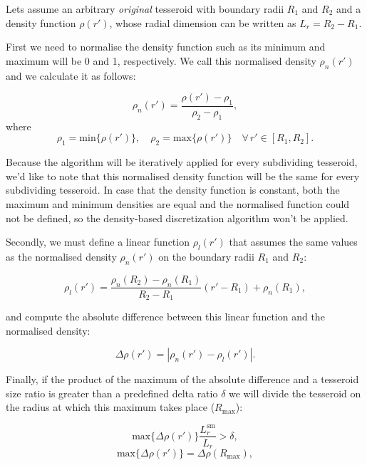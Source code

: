 \documentclass[extra]{gji}
\begin{document}
Lets assume an arbitrary \emph{original} tesseroid with boundary radii 
$R_1$ and $R_2$ and a density function $\rho(r')$, whose radial 
dimension can be written as $L_r = R_2 - R_1$.

First we need to normalise the density function such as its minimum and 
maximum will be 0 and 1, respectively.
We call this normalised density $\rho_n(r')$ and we calculate it as 
follows:

\begin{equation}
    \rho_n(r') = \frac{\rho(r') - \rho_1}{\rho_2 - \rho_1},
\end{equation}
\noindent where
\begin{equation}
    \rho_1 = \text{min}\{ \rho(r') \}, \quad
    \rho_2 = \text{max}\{ \rho(r') \} \quad
    \forall \, r' \in [R_1, R_2].
\end{equation}

Because the algorithm will be iteratively applied for every 
subdividing tesseroid, we'd like to note that this normalised density 
function will be the same for every subdividing tesseroid.
In case that the density function is constant, both the maximum and 
minimum densities are equal and the normalised function could not 
be defined, so the density-based discretization algorithm won't be 
applied.

Secondly, we must define a linear function $\rho_l(r')$ that assumes 
the same values as the normalised density $\rho_n(r')$ on the boundary 
radii $R_1$ and $R_2$:

\begin{equation}
    \rho_l(r') =
    \frac{ \rho_n(R_2) - \rho_n(R_1) }{ R_2 - R_1 } (r' - R_1) + \rho_n(R_1),
    \label{eq:density-reference-line}
\end{equation}

\noindent and compute the absolute difference between this linear 
function and the normalised density:

\begin{equation}
    \Delta \rho (r') = | \rho_n(r') - \rho_l(r') |.
    \label{eq:density-abs-diff}
\end{equation}

Finally, if the product of the maximum of the absolute difference and a 
tesseroid size ratio is greater than a predefined delta ratio $\delta$ 
we will divide the tesseroid on the radius at which this maximum takes 
place ($R_\text{max}$):

\begin{equation}
    \text{max}\{ \Delta \rho(r') \} \frac{L_r^\text{sm}}{L_r} > \delta,
    \label{eq:delta-density}
\end{equation}
\begin{equation}
    \text{max}\{ \Delta \rho(r') \} = \Delta \rho(R_\text{max}),
\end{equation}
\end{document}
